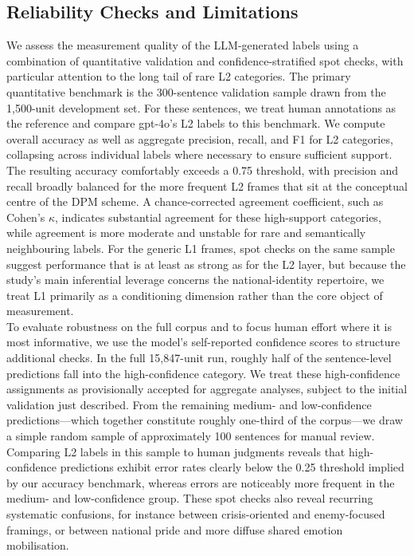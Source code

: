 \documentclass[man,12pt]{apa7}
\begin{document}
\subsection{Reliability Checks and Limitations}

We assess the measurement quality of the LLM-generated labels using a combination of quantitative validation and confidence-stratified spot checks, with particular attention to the long tail of rare L2 categories. 
The primary quantitative benchmark is the 300-sentence validation sample drawn from the 1,500-unit development set. 
For these sentences, we treat human annotations as the reference and compare gpt-4o's L2 labels to this benchmark. 
We compute overall accuracy as well as aggregate precision, recall, and F1 for L2 categories, collapsing across individual labels where necessary to ensure sufficient support. 
The resulting accuracy comfortably exceeds a 0.75 threshold, with precision and recall broadly balanced for the more frequent L2 frames that sit at the conceptual centre of the DPM scheme. 
A chance-corrected agreement coefficient, such as Cohen's $\kappa$, indicates substantial agreement for these high-support categories, while agreement is more moderate and unstable for rare and semantically neighbouring labels. 
For the generic L1 frames, spot checks on the same sample suggest performance that is at least as strong as for the L2 layer, but because the study's main inferential leverage concerns the national-identity repertoire, we treat L1 primarily as a conditioning dimension rather than the core object of measurement.\\%
To evaluate robustness on the full corpus and to focus human effort where it is most informative, we use the model's self-reported confidence scores to structure additional checks. 
In the full 15,847-unit run, roughly half of the sentence-level predictions fall into the high-confidence category. 
We treat these high-confidence assignments as provisionally accepted for aggregate analyses, subject to the initial validation just described. 
From the remaining medium- and low-confidence predictions---which together constitute roughly one-third of the corpus---we draw a simple random sample of approximately 100 sentences for manual review. 
Comparing L2 labels in this sample to human judgments reveals that high-confidence predictions exhibit error rates clearly below the 0.25 threshold implied by our accuracy benchmark, whereas errors are noticeably more frequent in the medium- and low-confidence group. 
These spot checks also reveal recurring systematic confusions, for instance between crisis-oriented and enemy-focused framings, or between national pride and more diffuse shared emotion mobilisation. 
\end{document}
